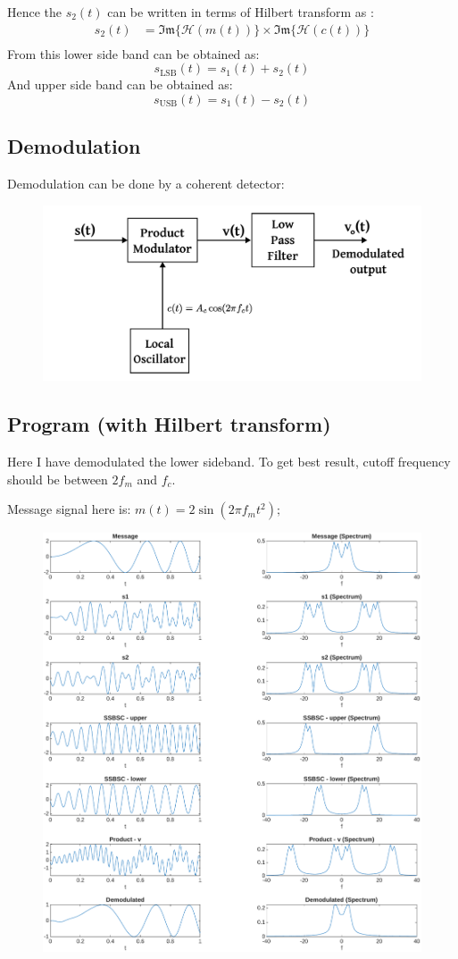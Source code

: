 Hence the $s_2(t)$ can be written in terms of Hilbert transform as :
\begin{align*}
	s_2(t) &= \mathfrak{Im}\{\mathcal{H}(m(t))\}\times \mathfrak{Im}\{\mathcal{H}(c(t))\} \\
\end{align*}
From this lower side band can be obtained as:
$$s_{\text{LSB}}(t) = s_1(t) + s_2(t)$$
And upper side band can be obtained as:
$$s_{\text{USB}}(t) = s_1(t) - s_2(t)$$

\subsection{Demodulation}
Demodulation can be done by a coherent detector:
\begin{figure}[H]
	\centering
	\includegraphics[width=.7\textwidth]{img/coh_detec.pdf}
\end{figure}

\subsection*{Program (with Hilbert transform)}
Here I have demodulated the lower sideband. To get best result, cutoff frequency should be between $2f_m$ and $f_c$.

Message signal here is: $m(t) = 2\sin(2\pi f_m t^2);$

\begin{figure}[H]
	\centering
	\includegraphics[width=\textwidth]{img/ssbsc.pdf}
\end{figure}

\pagebreak